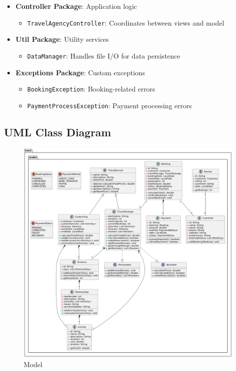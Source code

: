\documentclass[12pt]{article}
\begin{document}
\begin{itemize}
    \item \textbf{Controller Package}: Application logic
    \begin{itemize}
        \item \texttt{TravelAgencyController}: Coordinates between views and model
    \end{itemize}
    
    \item \textbf{Util Package}: Utility services
    \begin{itemize}
        \item \texttt{DataManager}: Handles file I/O for data persistence
    \end{itemize}
    
    \item \textbf{Exceptions Package}: Custom exceptions
    \begin{itemize}
        \item \texttt{BookingException}: Booking-related errors
        \item \texttt{PaymentProcessException}: Payment processing errors
    \end{itemize}
\end{itemize}

\subsection{UML Class Diagram}

\begin{figure}[H]
\centering
\includegraphics[width=\textwidth]{uml1.png}
\caption{Model}
\end{figure}
\newpage
\end{document}
